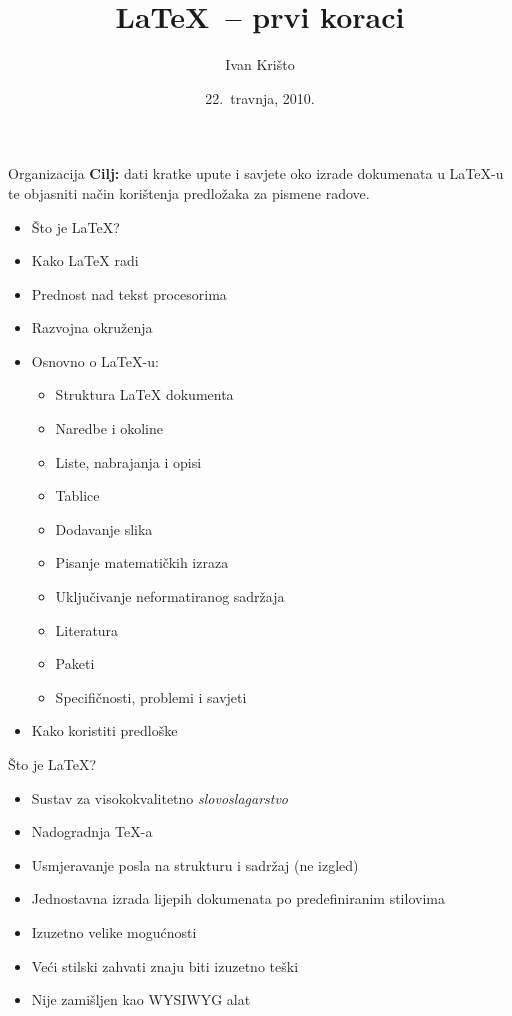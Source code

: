 \documentclass{beamer}
\title{\LaTeX\ -- prvi koraci}
\author{Ivan Krišto}
\institute{Fakultet elektrotehnike i računarstva, Zagreb}
\date{22.~travnja, 2010.}
\begin{document}
\begin{frame}[t,plain]
\titlepage
\end{frame}

\begin{frame}[t]{Organizacija}
\textbf{Cilj:} dati kratke upute i savjete oko izrade dokumenata u \LaTeX-u te
objasniti način korištenja predložaka za pismene radove.

\pause
\begin{multicols}{2}
\begin{itemize}
  \item Što je \LaTeX{}?
  \item Kako \LaTeX{} radi
  \item Prednost nad tekst procesorima
  \item Razvojna okruženja
\pause
  \item Osnovno o \LaTeX-u:
  \begin{itemize}
    \item Struktura \LaTeX{} dokumenta
    \item Naredbe i okoline
    \item Liste, nabrajanja i opisi
    \item Tablice
    \item Dodavanje slika
    \item Pisanje matematičkih izraza
    \item Uključivanje neformatiranog sadržaja 
    \item Literatura
    \item Paketi
    \item Specifičnosti, problemi i savjeti
  \end{itemize}
\pause
  \item Kako koristiti predloške
\end{itemize}
\end{multicols}
\end{frame}

\begin{frame}[t]{Što je \LaTeX{}?}
\begin{itemize}
  \item Sustav za visokokvalitetno \emph{slovoslagarstvo}
  \item Nadogradnja \TeX-a
  \item Usmjeravanje posla na strukturu i sadržaj (ne izgled)
  \item Jednostavna izrada lijepih dokumenata po predefiniranim stilovima
  \item Izuzetno velike mogućnosti
  \item Veći stilski zahvati znaju biti izuzetno teški
  \item Nije zamišljen kao WYSIWYG alat
\end{itemize}
\end{frame}
\end{document}

